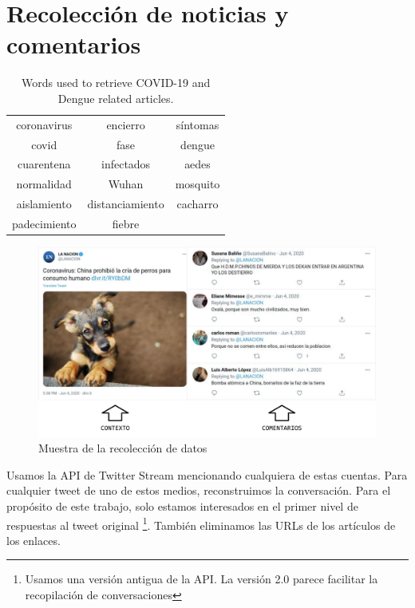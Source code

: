 \section{Recolección de noticias y comentarios}

\begin{table}[t]
    \centering
    \begin{tabular}{ c|c|c }
        coronavirus  &  encierro          & síntomas \\
        covid        &  fase              & dengue   \\
        cuarentena   &  infectados        & aedes    \\
        normalidad   &  Wuhan             & mosquito \\
        aislamiento  &  distanciamiento   & cacharro \\
        padecimiento &  fiebre            &          \\
    \end{tabular}
    \caption{Words used to retrieve COVID-19 and Dengue related articles.\label{tab:article_words}}
\end{table}



\begin{figure}
    \centering
    \includegraphics[width=\textwidth]{img/idea_dataset.pdf}
    \caption{Muestra de la recolección de datos}
    \label{fig:idea_dataset}
\end{figure}




Usamos la API de Twitter Stream mencionando cualquiera de estas cuentas.  Para cualquier tweet de uno de estos medios, reconstruimos la conversación. Para el propósito de este trabajo, solo estamos interesados en el primer nivel de respuestas al tweet original \footnote{Usamos una versión antigua de la API. La versión 2.0 parece facilitar la recopilación de conversaciones}. También eliminamos las URLs de los artículos de los enlaces.


